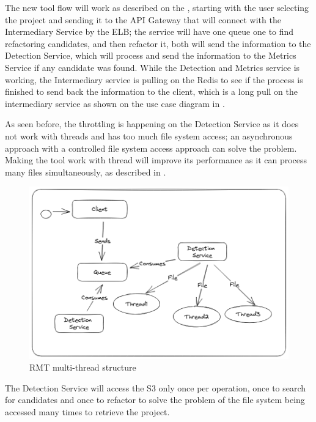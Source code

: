 The new tool flow will work as described on the , starting with the user selecting the project and sending it to the API Gateway that will connect with the Intermediary Service by the ELB; the service will have one queue one to find refactoring candidates, and then refactor it, both will send the information to the Detection Service, which will process and send the information to the Metrics Service if any candidate was found. While the Detection and Metrics service is working, the Intermediary service is pulling on the Redis to see if the process is finished to send back the information to the client, which is a long pull on the intermediary service as shown on the use case diagram in .


As seen before, the throttling is happening on the Detection Service as it does not work with threads and has too much file system access; an asynchronous approach with a controlled file system access approach can solve the problem. Making the tool work with thread will improve its performance as it can process many files simultaneously, as described in .

\begin{figure}[ht!]
\SetCaptionWidth{\textwidth}
\caption{RMT multi-thread structure}
\label{fig-threading}
\includegraphics[width =\textwidth, scale=0.2]{Chapter-5/Figures/threadDivision.png}
\end{figure}

The Detection Service will access the S3 only once per operation, once to search for candidates and once to refactor to solve the problem of the file system being accessed many times to retrieve the project.

